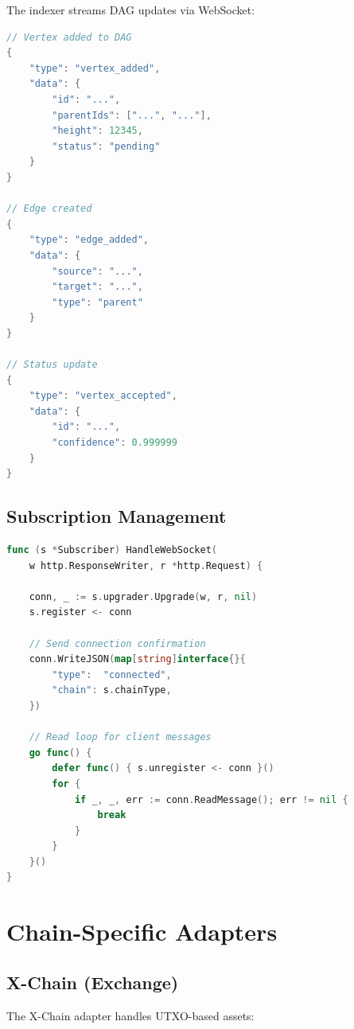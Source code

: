 \documentclass[11pt,twocolumn]{article}
\begin{document}
The indexer streams DAG updates via WebSocket:

\begin{lstlisting}[language=Go,caption={WebSocket message types}]
// Vertex added to DAG
{
    "type": "vertex_added",
    "data": {
        "id": "...",
        "parentIds": ["...", "..."],
        "height": 12345,
        "status": "pending"
    }
}

// Edge created
{
    "type": "edge_added",
    "data": {
        "source": "...",
        "target": "...",
        "type": "parent"
    }
}

// Status update
{
    "type": "vertex_accepted",
    "data": {
        "id": "...",
        "confidence": 0.999999
    }
}
\end{lstlisting}

\subsection{Subscription Management}

\begin{lstlisting}[language=Go,caption={DAG subscription handler}]
func (s *Subscriber) HandleWebSocket(
    w http.ResponseWriter, r *http.Request) {

    conn, _ := s.upgrader.Upgrade(w, r, nil)
    s.register <- conn

    // Send connection confirmation
    conn.WriteJSON(map[string]interface{}{
        "type":  "connected",
        "chain": s.chainType,
    })

    // Read loop for client messages
    go func() {
        defer func() { s.unregister <- conn }()
        for {
            if _, _, err := conn.ReadMessage(); err != nil {
                break
            }
        }
    }()
}
\end{lstlisting}

\section{Chain-Specific Adapters}

\subsection{X-Chain (Exchange)}

The X-Chain adapter handles UTXO-based assets:
\end{document}
